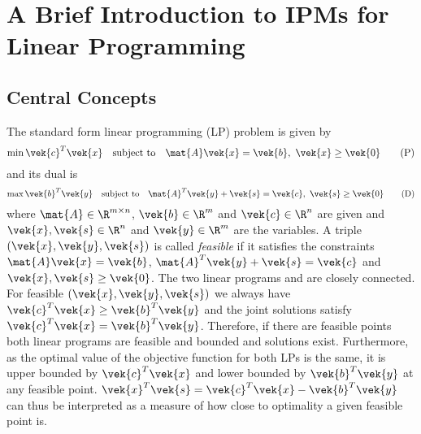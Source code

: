 \chapter{A Brief Introduction to IPMs for Linear Programming}\label{chap:ipm}

\section{Central Concepts}

The standard form linear programming (LP) problem is given by
\begin{equation}\label{eqn:primal-lp}
 \min \vek{c}^T \vek{x} \quad \text{subject to} \quad \mat{A}\vek{x} = \vek{b}, \ \vek{x} \geq \vek{0} \tag{P}
\end{equation}
and its dual is
\begin{equation}\label{eqn:dual-lp}
  \max \vek{b}^T \vek{y} \quad \text{subject to} \quad \mat{A}^T \vek{y} + \vek{s} = \vek{c}, \ \vek{s} \geq \vek{0} \tag{D}
\end{equation}
where \(\mat{A} \in \R^{m \times n}\), \(\vek{b} \in \R^m\) and \(\vek{c} \in \R^n\) are given and \(\vek{x}, \vek{s} \in \R^n\) and \(\vek{y} \in \R^m\) are the variables.
A triple \((\vek{x}, \vek{y}, \vek{s})\) is called \emph{feasible} if it satisfies the constraints \(\mat{A}\vek{x} = \vek{b}\), \(\mat{A}^T \vek{y} + \vek{s} = \vek{c}\) and \(\vek{x}, \vek{s} \geq \vek{0}\).
The two linear programs  and  are closely connected.
For feasible \((\vek{x}, \vek{y}, \vek{s})\) we always have \(\vek{c}^T \vek{x} \geq \vek{b}^T \vek{y}\) and the joint solutions satisfy \(\vek{c}^T \vek{x} = \vek{b}^T \vek{y}\).
Therefore, if there are feasible points both linear programs are feasible and bounded and solutions exist.
Furthermore, as the optimal value of the objective function for both LPs is the same, it is upper bounded by \(\vek{c}^T \vek{x}\) and lower bounded by \(\vek{b}^T \vek{y}\) at any feasible point.
\(\vek{x}^T \vek{s} = \vek{c}^T \vek{x} - \vek{b}^T \vek{y}\) can thus be interpreted as a measure of how close to optimality a given feasible point is.

